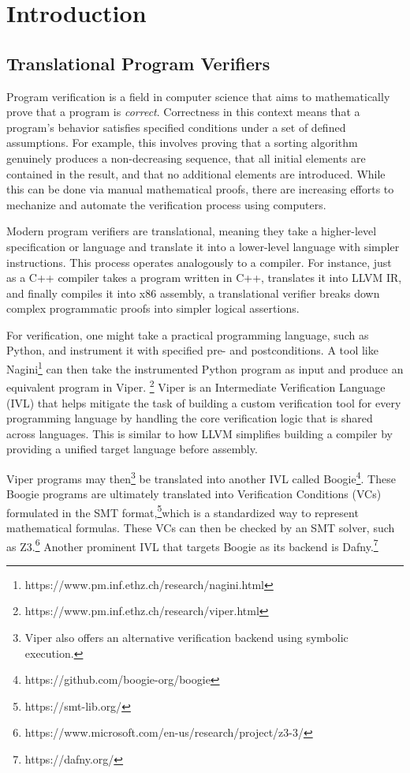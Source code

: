 \documentclass[11pt]{article}
\begin{document}
\pagebreak

\tableofcontents

\pagebreak

\section{Introduction}

\subsection{Translational Program Verifiers}

Program verification is a field in computer science
that aims to mathematically prove that a program is \emph{correct}.
Correctness in this context means that a program's behavior satisfies specified conditions under a set of defined assumptions. %
For example, this involves proving that a sorting algorithm genuinely produces a non-decreasing sequence,
that all initial elements are contained in the result, and that no additional elements are introduced.
While this can be done via manual mathematical proofs,
there are increasing efforts to mechanize and automate the verification process using computers.

Modern program verifiers are translational, meaning they take a higher-level specification or language
and translate it into a lower-level language with simpler instructions.
This process operates analogously to a compiler. %
For instance, just as a C++ compiler takes a program written in C++, translates it into LLVM IR, and finally compiles it into x86 assembly,
a translational verifier breaks down complex programmatic proofs into simpler logical assertions.

For verification, one might take a practical programming language, such as Python,
and instrument it with specified pre- and postconditions.
A tool like Nagini\footnote{https://www.pm.inf.ethz.ch/research/nagini.html}
can then take the instrumented Python program as input and produce an equivalent program in Viper.
\footnote{https://www.pm.inf.ethz.ch/research/viper.html} 
Viper is an Intermediate Verification Language (IVL) that helps mitigate the task of building a custom verification tool
for every programming language by handling the core verification logic that is shared across languages.
This is similar to how LLVM simplifies building a compiler by providing a unified target language before assembly. 

Viper programs may then\footnote{Viper also offers an alternative verification backend using symbolic execution.} be translated into another IVL called Boogie\footnote{https://github.com/boogie-org/boogie}.
These Boogie programs are ultimately translated into Verification Conditions (VCs)
formulated in the SMT format,\footnote{https://smt-lib.org/}which is a standardized way to represent mathematical formulas.
These VCs can then be checked by an SMT solver, such as Z3.\footnote{https://www.microsoft.com/en-us/research/project/z3-3/}
Another prominent IVL that targets Boogie as its backend is Dafny.\footnote{https://dafny.org/}
\end{document}

